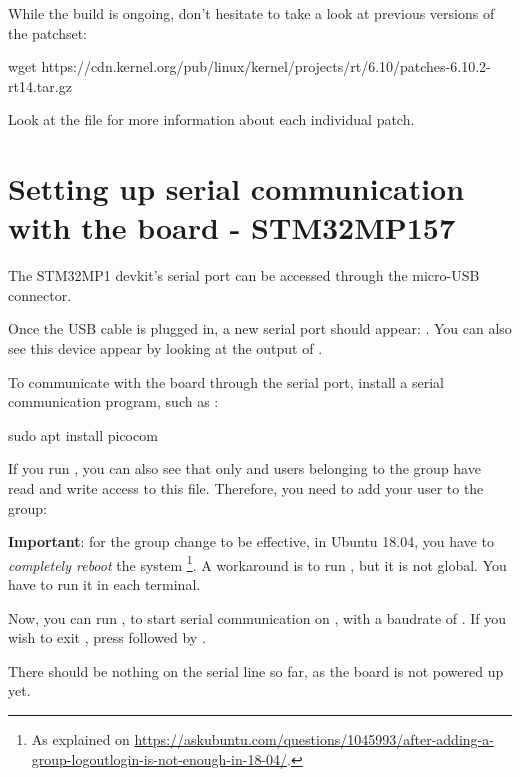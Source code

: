 While the build is ongoing, don't hesitate to take a look at previous versions of the patchset:

\begin{bashinput}
wget https://cdn.kernel.org/pub/linux/kernel/projects/rt/6.10/patches-6.10.2-rt14.tar.gz
\end{bashinput}

Look at the  file for more information about each individual patch.

\section{Setting up serial communication with the board - STM32MP157}

The STM32MP1 devkit's serial port can be accessed through the micro-USB connector.

Once the USB cable is plugged in, a new serial port
should appear: .  You can also see this device
appear by looking at the output of .

To communicate with the board through the serial port, install a
serial communication program, such as :

\begin{bashinput}
sudo apt install picocom
\end{bashinput}

If you run , you can also see that only
 and users belonging to the  group have
read and write access to this file. Therefore, you need to add your user
to the  group:


{\bf Important}: for the group change to be effective, in Ubuntu 18.04, you have to
{\em completely reboot} the system \footnote{As explained on
\url{https://askubuntu.com/questions/1045993/after-adding-a-group-logoutlogin-is-not-enough-in-18-04/}.}.
A workaround is to run , but it is not global.
You have to run it in each terminal.

Now, you can run , to start serial
communication on , with a baudrate of . If
you wish to exit , press \code{[Ctrl][a]} followed by
\code{[Ctrl][x]}.

There should be nothing on the serial line so far, as the board is not
powered up yet.

